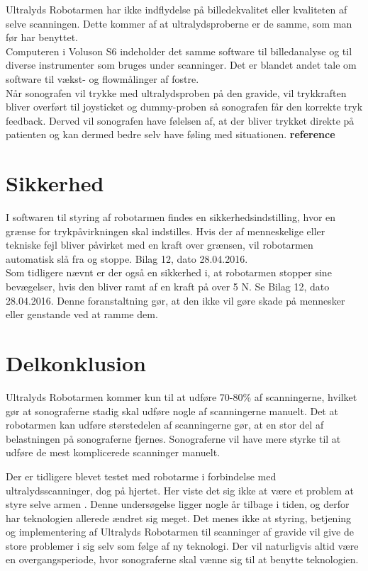 Ultralyds Robotarmen har ikke indflydelse på billedekvalitet eller kvaliteten af selve scanningen. Dette kommer af at ultralydsproberne er de samme, som man før har benyttet. \\
Computeren i Voluson S6 indeholder det samme software til billedanalyse og til diverse instrumenter som bruges under scanninger. Det er blandet andet tale om software til vækst- og flowmålinger af fostre.   \\
Når sonografen vil trykke med ultralydsproben på den gravide, vil trykkraften bliver overført til joysticket og dummy-proben så sonografen får den korrekte tryk feedback. Derved vil sonografen have følelsen af, at der bliver trykket direkte på patienten og kan dermed bedre selv have føling med situationen. \textbf{reference} 

\section{Sikkerhed}
I softwaren til styring af robotarmen findes en sikkerhedsindstilling, hvor en grænse for trykpåvirkningen skal indstilles. Hvis der af menneskelige eller tekniske fejl bliver påvirket med en kraft over grænsen, vil robotarmen automatisk slå fra og stoppe. Bilag 12, dato 28.04.2016. \\
Som tidligere nævnt er der også en sikkerhed i, at robotarmen stopper sine bevægelser, hvis den bliver ramt af en kraft på over 5 N. Se Bilag 12, dato 28.04.2016. Denne foranstaltning gør, at den ikke vil gøre skade på mennesker eller genstande ved at ramme dem. 

\section{Delkonklusion}
Ultralyds Robotarmen kommer kun til at udføre 70-80\% af scanningerne, hvilket gør at sonograferne stadig skal udføre nogle af scanningerne manuelt. Det at robotarmen kan udføre størstedelen af scanningerne gør, at en stor del af belastningen på sonograferne fjernes. Sonograferne vil have mere styrke til at udføre de mest komplicerede scanninger manuelt.

Der er tidligere blevet testet med robotarme i forbindelse med ultralydsscanninger, dog på hjertet. Her viste det sig ikke at være et problem at styre selve armen \cite{Hjerterobot}. Denne undersøgelse ligger nogle år tilbage i tiden, og derfor har teknologien allerede ændret sig meget. Det menes ikke at styring, betjening og implementering af Ultralyds Robotarmen til scanninger af gravide vil give de store problemer i sig selv som følge af ny teknologi. Der vil naturligvis altid være en overgangsperiode, hvor sonograferne skal vænne sig til at benytte teknologien. 